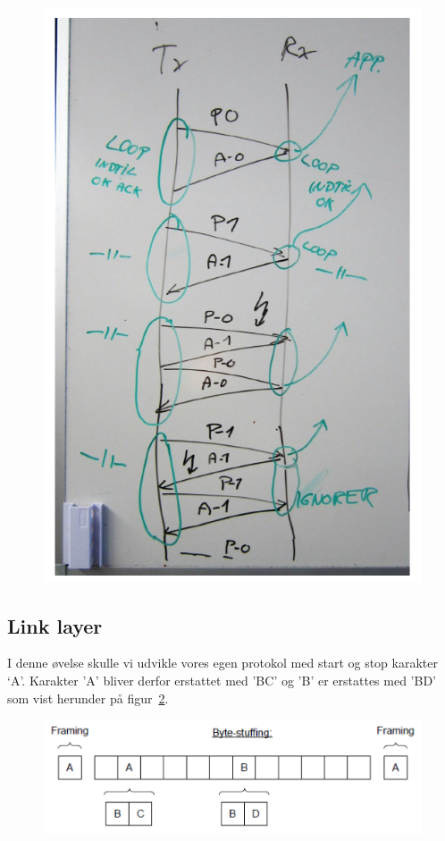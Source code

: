 \begin{figure}[h]
	\centering
	\includegraphics[width=\linewidth]{figs/sekvensdia}
	\caption{}
	\label{fig:sekvensdia}
\end{figure}

\subsection{Link layer}
I denne øvelse skulle vi udvikle vores egen protokol med start og stop karakter ‘A’. Karakter ’A’ bliver derfor
erstattet med ’BC’ og ’B’ er erstattes med ’BD’ som vist herunder på figur~\ref{fig:bd}.

\begin{figure}[H]
	\centering
	\includegraphics[width=0.7\linewidth]{figs/bd}
	\caption{}
	\label{fig:bd}
\end{figure}

